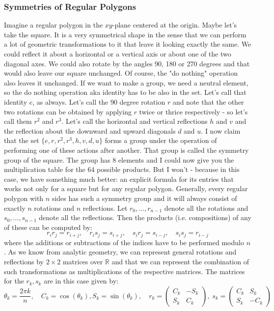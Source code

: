 \subsubsection{Symmetries of Regular Polygons}
Imagine a regular polygon in the $xy$-plane centered at the origin. Maybe let's take the square. It is a very symmetrical shape in the sense that we can perform a lot of geometric transformations to it that leave it looking exactly the same. We could reflect it about a horizontal or a vertical axis or about one of the two diagonal axes. We could also rotate by the angles 90, 180 or 270 degrees and that would also leave our square unchanged. Of course, the "do nothing" operation also leaves it unchanged. If we want to make a group, we need a neutral element, so the do nothing operation aka identity has to be also in the set. Let's call that identity $e$, as always. Let's call the 90 degree rotation $r$ and note that the other two rotations can be obtained by applying $r$ twice or thrice respectively - so let's call them $r^2$ and $r^3$. Let's call the horizontal and vertical reflections $h$ and $v$ and the reflection about the downward and upward diagonals $d$ and $u$. I now claim that the set $\{ e,r,r^2,r^3,h,v,d,u \}$ forms a group under the operation of performing one of these actions after another. That group is called the symmetry group of the square. The group has 8 elements and I could now give you the multiplication table for the 64 possible products. But I won't - because in this case, we have something much better: an explicit formula for its entries that works not only for a square but for any regular polygon. Generally, every regular polygon with $n$ sides has such a symmetry group and it will always consist of exactly $n$ rotations and $n$ reflections. Let $r_0,\ldots,r_{n-1}$ denote all the rotations and $s_0, \ldots,s_{n-1}$ denote all the reflections. Then the products (i.e. compositions) of any of these can be computed by:
\begin{equation}
r_i r_j = r_{i+j}, \quad
r_i s_j = s_{i+j}, \quad
s_i r_j = s_{i-j}, \quad
s_i s_j = r_{i-j}
\end{equation}	
where the additions or subtractions of the indices have to be performed modulo $n$. As we know from analytic geometry, we can represent general rotations and reflections by $2 \times 2$ matrices over $\mathbb{R}$ and that we can represent the combination of such transformations as multiplications of the respective matrices. The matrices for the $r_k, s_k$ are in this case given by:
\begin{equation}
\label{Eq:PolygonSymmetries}
\theta_k =\frac{2 \pi k}{n},  \quad
C_k = \cos(\theta_k), S_k = \sin(\theta_k), \quad	
r_k = \begin{pmatrix}  C_k & -S_k \\  S_k  &  C_k  \end{pmatrix}, \;
s_k = \begin{pmatrix}  C_k &  S_k \\  S_k  & -C_k  \end{pmatrix} \quad
\end{equation}	
